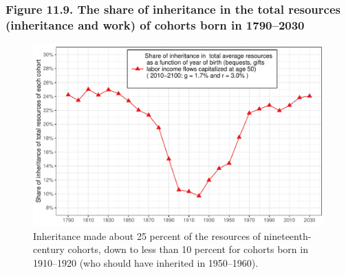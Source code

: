 \documentclass[t]{beamer}\usepackage[]{graphicx}\usepackage[]{color}
\newenvironment{knitrout}{}{} %
\begin{document}
\begin{frame}[label=Figure_11_9]
\frametitle{Figure 11.9. The share of inheritance in the total resources (inheritance and work) of cohorts born in 1790--2030}
\begin{figure}[t]
\begin{minipage}[b]{\textwidth}
\centering
\begin{knitrout}\footnotesize
{}\color{fgcolor}

{\centering \includegraphics[width=1\linewidth]{figures/color/Figure_11_9} 

}



\end{knitrout}
\caption{Inheritance made about 25 percent of the resources of nineteenth-century cohorts, down to less than 10 percent for cohorts born in 1910--1920 (who should have inherited in 1950--1960).}
\end{minipage}
\end{figure}
\end{frame}
\end{document}
